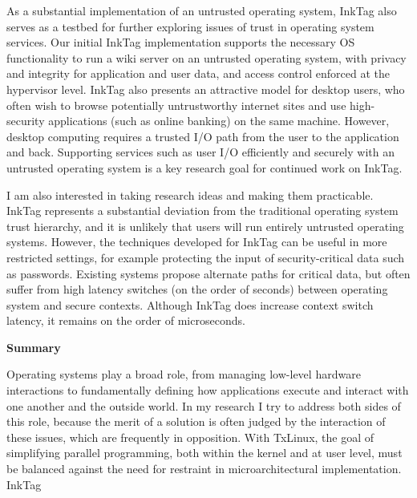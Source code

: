 \documentclass{article}
\newcommand{\inktag}{InkTag\xspace}
\begin{document}
As a substantial implementation of an untrusted operating system, \inktag
also serves as a testbed for further exploring issues of trust in operating
system services. Our initial \inktag implementation supports the necessary
OS functionality to run a wiki server on an untrusted operating system,
with privacy and integrity for application and user data, and access
control enforced at the hypervisor level. \inktag also presents an
attractive model for desktop users, who often wish to browse
potentially untrustworthy internet sites and use high-security applications
(such as online banking) on the same machine. However, desktop computing
requires a trusted I/O path from the user to the application and back.
Supporting services such as user I/O efficiently and securely with an
untrusted operating system is a key research goal for continued work on
\inktag.

I am also interested in taking research ideas and making them practicable.
\inktag represents a substantial deviation from the traditional operating
system trust hierarchy, and it is unlikely that users will run entirely
untrusted operating systems. However, the techniques developed for \inktag
can be useful in more restricted settings, for example protecting the input of
security-critical data such as passwords. Existing systems propose
alternate paths for critical data, but often suffer from high latency
switches (on the order of seconds) between operating system and secure
contexts. Although
\inktag does increase context switch latency, it remains on the order of
microseconds. 

{\bigskip \noindent \bf Summary}

\noindent Operating systems play a broad role, from managing low-level
hardware interactions to fundamentally defining how applications execute
and interact with one another and the outside world. In my research I try
to address both sides of this role, because the merit of a solution is
often judged by the interaction of these issues, which are frequently in
opposition. With TxLinux, the goal of simplifying parallel programming,
both within the kernel and at user level, must be balanced against the need
for restraint in microarchitectural implementation. \inktag 
\end{document}
